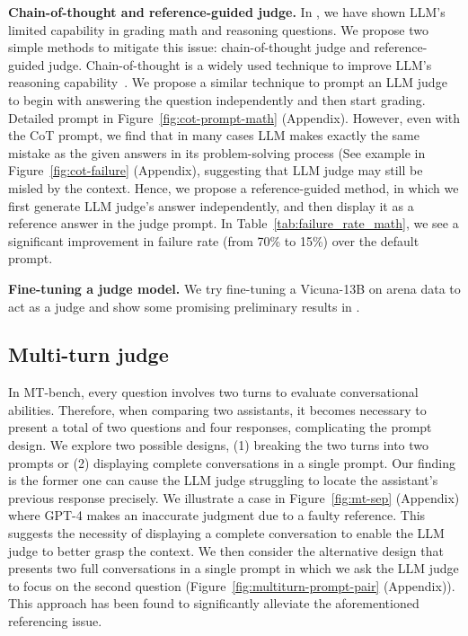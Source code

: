 \textbf{Chain-of-thought and reference-guided judge.}
\label{subsubsec:chain-of-through-judge}
In , we have shown LLM's limited capability in grading math and reasoning questions.
We propose two simple methods to mitigate this issue: chain-of-thought judge and reference-guided judge.
Chain-of-thought is a widely used technique to improve LLM's reasoning capability~\cite{wei2022chain}.
We propose a similar technique to prompt an LLM judge to begin with answering the question independently and then start grading.
Detailed prompt in Figure~\ref{fig:cot-prompt-math} (Appendix).
However, even with the CoT prompt, we find that in many cases LLM makes exactly the same mistake as the given answers in its problem-solving process (See example in Figure~\ref{fig:cot-failure} (Appendix), suggesting that LLM judge may still be misled by the context.
Hence, we propose a reference-guided method, in which we first generate LLM judge's answer independently, and then display it as a reference answer in the judge prompt.
In Table~\ref{tab:failure_rate_math}, we see a significant improvement in failure rate  (from 70\% to 15\%) over the default prompt.

\textbf{Fine-tuning a judge model.}
\label{subsubsec:fine-tuning-judge}
We try fine-tuning a Vicuna-13B on arena data to act as a judge and show some promising preliminary results in .

\subsection{Multi-turn judge}
In MT-bench, every question involves two turns to evaluate conversational abilities. 
Therefore, when comparing two assistants, it becomes necessary to present a total of two questions and four responses, complicating the prompt design.
We explore two possible designs, (1) breaking the two turns into two prompts or (2) displaying complete conversations in a single prompt.
Our finding is the former one can cause the LLM judge struggling to locate the assistant's previous response precisely.
We illustrate a case in Figure~\ref{fig:mt-sep} (Appendix) where GPT-4 makes an inaccurate judgment due to a faulty reference.
This suggests the necessity of displaying a complete conversation to enable the LLM judge to better grasp the context. 
We then consider the alternative design that presents two full conversations in a single prompt in which we ask the LLM judge to focus on the second question (Figure~\ref{fig:multiturn-prompt-pair} (Appendix)).
This approach has been found to significantly alleviate the aforementioned referencing issue. %













